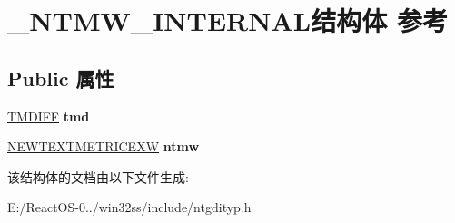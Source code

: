 \hypertarget{struct___n_t_m_w___i_n_t_e_r_n_a_l}{}\section{\+\_\+\+N\+T\+M\+W\+\_\+\+I\+N\+T\+E\+R\+N\+A\+L结构体 参考}
\label{struct___n_t_m_w___i_n_t_e_r_n_a_l}
\subsection*{Public 属性}
\begin{DoxyCompactItemize}
\item 
\mbox{\label{struct___n_t_m_w___i_n_t_e_r_n_a_l_a8c22668430221f522d46f58b7beb0eea}} 
\hyperlink{struct___t_m_d_i_f_f}{T\+M\+D\+I\+FF} {\bfseries tmd}
\item 
\mbox{\label{struct___n_t_m_w___i_n_t_e_r_n_a_l_aa8fa9549f8ba01ccdcfac0af472758a2}} 
\hyperlink{structtag_n_e_w_t_e_x_t_m_e_t_r_i_c_e_x_w}{N\+E\+W\+T\+E\+X\+T\+M\+E\+T\+R\+I\+C\+E\+XW} {\bfseries ntmw}
\end{DoxyCompactItemize}


该结构体的文档由以下文件生成\+:\begin{DoxyCompactItemize}
\item 
E\+:/\+React\+O\+S-\/0../win32ss/include/ntgdityp.\+h\end{DoxyCompactItemize}

